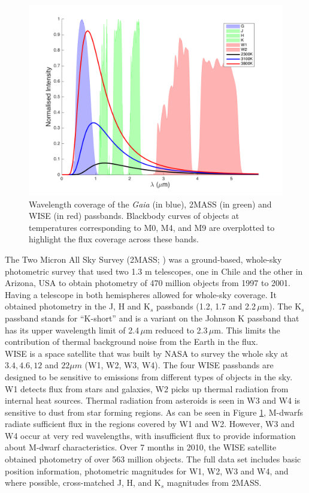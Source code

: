 \begin{figure}[!ht]
\hspace{-1cm}
\includegraphics[scale=0.8]{Passbands.png}
\caption{Wavelength coverage of the {\em Gaia} (in blue), 2MASS (in green) and WISE (in red) passbands. Blackbody curves of objects at temperatures corresponding to M0, M4, and M9 are overplotted to highlight the flux coverage across these bands.}
\label{FigPassband}
\end{figure}
The Two Micron All Sky Survey (2MASS; \citealt{2006Skrutskie}) was a ground-based, whole-sky photometric survey that used two 1.3 m telescopes, one in Chile and the other in Arizona, USA to obtain photometry of 470 million objects from 1997 to 2001. Having a telescope in both hemispheres allowed for whole-sky coverage. It obtained photometry in the J, H and K$_s$ passbands (1.2, 1.7 and 2.2\,$\mu$m). The K$_s$ passband stands for ``K-short'' and is a variant on the Johnson K passband that has its upper wavelength limit of 2.4\,$\mu$m reduced to 2.3\,$\mu$m. This limits the contribution of thermal background noise from the Earth in the flux.\\

WISE \citep{2010Wright} is a space satellite that was built by NASA to survey the whole sky at $3.4, 4.6, 12$ and $22 \mu m$ (W1, W2, W3, W4). The four WISE passbands are designed to be sensitive to emissions from different types of objects in the sky. W1 detects flux from stars and galaxies, W2 picks up thermal radiation from internal heat sources. Thermal radiation from asteroids is seen in W3 and W4 is sensitive to dust from star forming regions. As can be seen in Figure \ref{FigPassband}, M-dwarfs radiate sufficient flux in the regions covered by W1 and W2. However, W3 and W4 occur at very red wavelengths, with insufficient flux to provide information about M-dwarf characteristics. Over 7 months in 2010, the WISE satellite obtained photometry of over 563 million objects. The full data set includes basic position information, photometric magnitudes for W1, W2, W3 and W4, and where possible, cross-matched J, H, and K$_s$ magnitudes from 2MASS.\\


